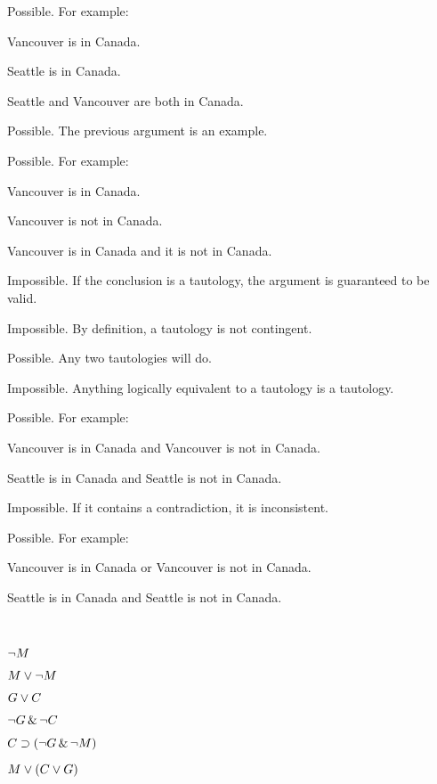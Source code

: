 \begin{earg}
\item Possible. For example:
	\begin {earg}
	\item[] Vancouver is in Canada.
	\item[] Seattle is in Canada.
	\item[\therefore] Seattle and Vancouver are both in Canada.
	\end{earg}
\item[2.] Possible. The previous argument is an example.
\item[3.] Possible. For example:
	\begin {earg}
	\item[] Vancouver is in Canada.
	\item[] Vancouver is not in Canada.
	\item[\therefore] Vancouver is in Canada and it is not in Canada.
	\end{earg}
\item[4.] Impossible. If the conclusion is a tautology, the argument is guaranteed to be valid.
\item[5.] Impossible. By definition, a tautology is not contingent.
\item[6.] Possible. Any two tautologies will do.
\item[7.] Impossible. Anything logically equivalent to a tautology is a tautology.
\item[8.] Possible. For example:
	\begin {earg}
	\item[] Vancouver is in Canada and Vancouver is not in Canada.
	\item[] Seattle is in Canada and Seattle is not in Canada.
	\end{earg}
\item[9.] Impossible. If it contains a contradiction, it is inconsistent.
\item[10.] Possible. For example:
	\begin {earg}
	\item[] Vancouver is in Canada or Vancouver is not in Canada.
	\item[] Seattle is in Canada and Seattle is not in Canada.
	\end{earg}
\end{earg}\

\begin{earg}
\item $\neg M$
\item $M \vee \neg M$
\item $G \vee C$
\item $\neg G \,\&\, \neg C$
\item $C \supset (\neg G \,\&\, \neg M)$
\item $M \vee (C \vee G)$
\end{earg}

